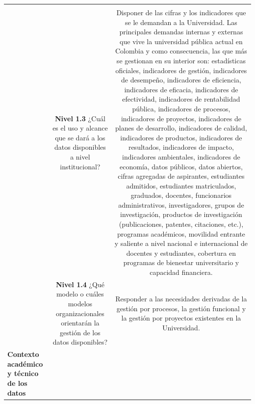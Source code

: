 \documentclass[
]{book}
\begin{document}
\begin{longtable}[]{@{}lcc@{}}
\begin{minipage}[t]{0.69\columnwidth}
\end{minipage}\tabularnewline
\begin{minipage}[t]{0.04\columnwidth}\raggedright
\strut
\end{minipage} & \begin{minipage}[t]{0.18\columnwidth}\centering
\textbf{Nivel 1.3} ¿Cuál es el uso y alcance que se dará a los datos disponibles a nivel institucional?\strut
\end{minipage} & \begin{minipage}[t]{0.69\columnwidth}\centering
Disponer de las cifras y los indicadores que se le demandan a la Universidad. Las principales demandas internas y externas que vive la universidad pública actual en Colombia y como consecuencia, las que más se gestionan en su interior son: estadísticas oficiales, indicadores de gestión, indicadores de desempeño, indicadores de eficiencia, indicadores de eficacia, indicadores de efectividad, indicadores de rentabilidad pública, indicadores de procesos, indicadores de proyectos, indicadores de planes de desarrollo, indicadores de calidad, indicadores de productos, indicadores de resultados, indicadores de impacto, indicadores ambientales, indicadores de economía, datos públicos, datos abiertos, cifras agregadas de aspirantes, estudiantes admitidos, estudiantes matriculados, graduados, docentes, funcionarios administrativos, investigadores, grupos de investigación, productos de investigación (publicaciones, patentes, citaciones, etc.), programas académicos, movilidad entrante y saliente a nivel nacional e internacional de docentes y estudiantes, cobertura en programas de bienestar universitario y capacidad financiera.\strut
\end{minipage}\tabularnewline
\begin{minipage}[t]{0.04\columnwidth}\raggedright
\strut
\end{minipage} & \begin{minipage}[t]{0.18\columnwidth}\centering
\textbf{Nivel 1.4} ¿Qué modelo o cuáles modelos organizacionales orientarán la gestión de los datos disponibles?\strut
\end{minipage} & \begin{minipage}[t]{0.69\columnwidth}\centering
Responder a las necesidades derivadas de la gestión por procesos, la gestión funcional y la gestión por proyectos existentes en la Universidad.\strut
\end{minipage}\tabularnewline
\begin{minipage}[t]{0.04\columnwidth}\raggedright
\textbf{Contexto académico y técnico de los datos}\strut

\end{minipage}
\end{longtable}
\end{document}
